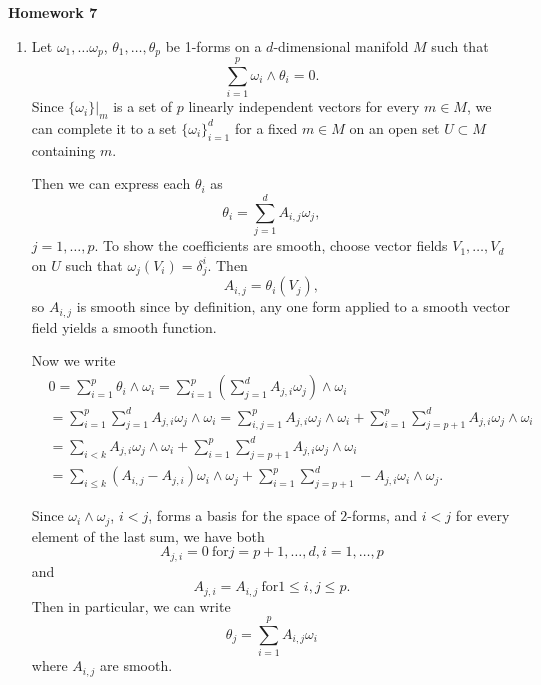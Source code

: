 \documentclass[11pt, reqno]{article}
\theoremstyle{plain}
\theoremstyle{definition}
\theoremstyle{remark}
\begin{document}
\topmargin=-40pt
\renewcommand{\headrulewidth}{1pt}
\renewcommand{\headsep}{20pt}
\thispagestyle{fancy}

{\Huge \bfseries \noindent Homework 7}

\begin{enumerate}
    \item[1.] Let $\omega_1, \dots \omega_p$, $\theta_1, \dots, \theta_p$ be 1-forms on a $d$-dimensional
    manifold $M$ such that 
    \[
        \sum_{i = 1}^p \omega_i \wedge \theta_i = 0.
    \]
    Since $\{\omega_i\}|_m$ is a set of $p$ linearly independent vectors for every $m \in M$, we can 
    complete it to a set $\{\omega_i\}_{i = 1}^d$ for a fixed $m \in M$ on an open set $U \subset M$
    containing $m$. 

    Then we can express each $\theta_i$ as
    \[
        \theta_i = \sum_{j = 1}^d A_{i,j}\omega_j,
    \]
    $j = 1, \dots, p$. To show the coefficients are smooth, choose vector fields $V_1, \dots, V_d$ on $U$ such 
    that $\omega_j(V_i) = \delta_{j}^i$. Then 
    \[
        A_{i,j} = \theta_i(V_j),
    \]
    so $A_{i,j}$ is smooth since by definition, any one form applied to a smooth vector field yields a 
    smooth function. 

    Now we write
    \begin{align*}
        &0 = \sum_{i = 1}^p \theta_i \wedge \omega_i = \sum_{i = 1}^p\left(\sum_{j = 1}^d A_{j,i}\omega_j\right)
        \wedge \omega_i\\
        &= \sum_{i=1}^p \sum_{j = 1}^d A_{j,i}\omega_j \wedge \omega_i = \sum_{i,j = 1}^p A_{j,i} \omega_j \wedge \omega_i
        + \sum_{i = 1}^p \sum_{j = p + 1}^d A_{j,i} \omega_j \wedge \omega_i\\
        &= \sum_{i < k} A_{j,i}\omega_j \wedge \omega_i + \sum_{i = 1}^p \sum_{j = p + 1}^d A_{j,i} \omega_j \wedge \omega_i\\
        &= \sum_{i \leq k}(A_{i,j} - A_{j,i})\omega_i \wedge \omega_j + \sum_{i = 1}^p \sum_{j = p + 1}^d -A_{j,i} \omega_i \wedge \omega_j.
    \end{align*}

    Since $\omega_i \wedge \omega_j$, $i < j$, forms a basis for the space of $2$-forms, and $i < j$ for every
    element of the last sum, we have both 
    \[
        A_{j,i} = 0\ \text{for} j = p+ 1, \dots, d, i = 1, \dots, p
    \]
    and
    \[
        A_{j,i} = A_{i,j}\ \text{for} 1 \leq i,j \leq p.
    \]
    Then in particular, we can write
    \[
        \theta_j = \sum_{i = 1}^p A_{i,j} \omega_i
    \]
    where $A_{i,j}$ are smooth.


\end{enumerate}
\end{document}
